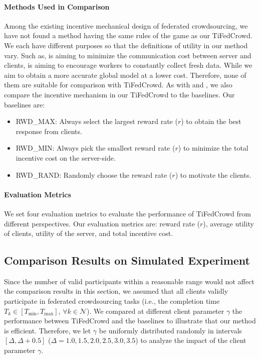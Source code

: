 \documentclass[final,1p,times]{elsarticle}
\begin{document}
\paragraph{\textbf{Methods Used in Comparison}}
Among the existing incentive mechanical design of federated crowdsourcing, we have not found a method having the same rules of the game as our TiFedCrowd. We each have different purposes so that the definitions of utility in our method vary. Such as, \cite{pandey2019incentivize} is aiming to minimize the communication cost between server and clients, \cite{kang2022incentive} is aiming to encourage workers to constantly collect fresh data. While we aim to obtain a more accurate global model at a lower cost. Therefore, none of them are suitable for comparison with TiFedCrowd. As with \cite{pandey2019incentivize} and \cite{kang2022incentive}, we also compare the incentive mechanism in our TiFedCrowd to the baselines. Our baselines are:
\begin{itemize}
	\item RWD\_MAX: Always select the largest reward rate ($r$) to obtain the best response from clients.  
	\item RWD\_MIN: Always pick the smallest reward rate ($r$) to minimize the total incentive cost on the server-side.
	\item RWD\_RAND: Randomly choose the reward rate ($r$) to motivate the clients.
\end{itemize}

\paragraph{\textbf{Evaluation Metrics}}
We set four evaluation metrics to evaluate the performance of TiFedCrowd from different perspectives. Our evaluation metrics are: reward rate ($r$), average utility of clients, utility of the server, and total incentive cost. 
\subsection{Comparison Results on Simulated Experiment} \label{PCWB}
Since the number of valid participants within a reasonable range would not affect the comparison results in this section, we assumed that all clients validly participate in federated crowdsourcing tasks (i.e., the completion time $T_k\in[T_{\min},T_{\max}],\,\forall k\in\bm{\mathcal{N}}$).
We compared at different client parameter $\gamma$ the performance between TiFedCrowd and the baselines to illustrate that our method is efficient. Therefore, we let $\gamma$ be uniformly distributed randomly in intervals $[\Delta, \Delta + 0.5]$ ($\Delta = 1.0, 1.5, 2.0, 2.5, 3.0, 3.5$) to analyze the impact of the client parameter $\gamma$.
\end{document}
